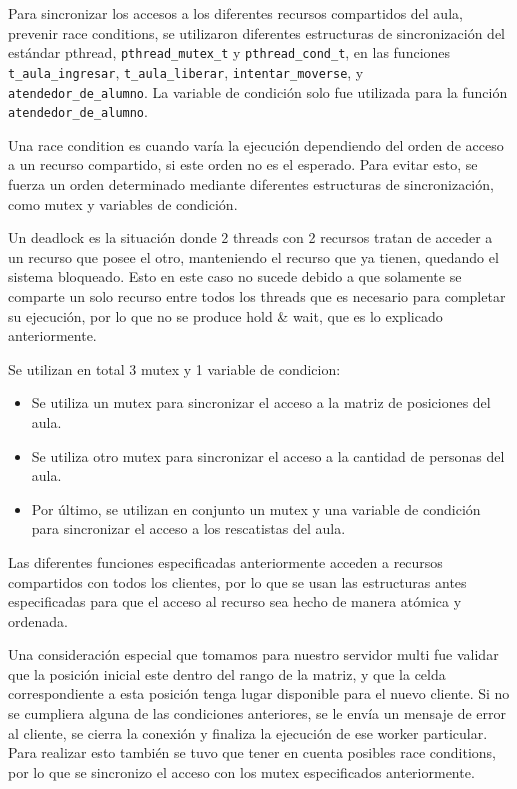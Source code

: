 Para sincronizar los accesos a los diferentes recursos compartidos del aula, prevenir race conditions, se utilizaron diferentes estructuras de sincronizaci\'on del est\'andar pthread, \verb|pthread_mutex_t| y \verb|pthread_cond_t|, en las funciones \verb|t_aula_ingresar|, \verb|t_aula_liberar|, \verb|intentar_moverse|, y \\\verb|atendedor_de_alumno|. La variable de condici\'on solo fue utilizada para la funci\'on \verb|atendedor_de_alumno|.

Una race condition es cuando var\'ia la ejecuci\'on dependiendo del orden de acceso a un recurso compartido, si este orden no es el esperado. Para evitar esto, se fuerza un orden determinado mediante diferentes estructuras de sincronizaci\'on, como mutex y variables de condici\'on.

Un deadlock es la situaci\'on donde 2 threads con 2 recursos tratan de acceder a un recurso que posee el otro, manteniendo el recurso que ya tienen, quedando el sistema bloqueado. Esto en este caso no sucede debido a que solamente se comparte un solo recurso entre todos los threads que es necesario para completar su ejecuci\'on, por lo que no se produce hold & wait, que es lo explicado anteriormente.

Se utilizan en total 3 mutex y 1 variable de condicion:

\begin{itemize}
\item Se utiliza un mutex para sincronizar el acceso a la matriz de posiciones del aula.
\item Se utiliza otro mutex para sincronizar el acceso a la cantidad de personas del aula.
\item Por \'ultimo, se utilizan en conjunto un mutex y una variable de condici\'on para sincronizar el acceso a los rescatistas del aula.
\end{itemize}

Las diferentes funciones especificadas anteriormente acceden a recursos compartidos con todos los clientes, por lo que se usan las estructuras antes especificadas para que el acceso al recurso sea hecho de manera at\'omica y ordenada.

Una consideraci\'on especial que tomamos para nuestro servidor multi fue validar que la posici\'on inicial este dentro del rango de la matriz, y que la celda correspondiente a esta posici\'on tenga lugar disponible para el nuevo cliente. Si no se cumpliera alguna de las condiciones anteriores, se le env\'ia un mensaje de error al cliente, se cierra la conexi\'on y finaliza la ejecuci\'on de ese worker particular. Para realizar esto tambi\'en se tuvo que tener en cuenta posibles race conditions, por lo que se sincronizo el acceso con los mutex especificados anteriormente.

